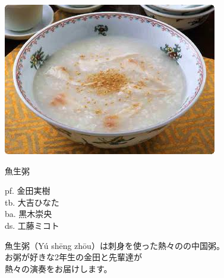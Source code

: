 \documentclass[a4paper]{article}
\begin{document}
\begin{minipage}{0.25\textheight}
    \flushleft
    \includegraphics[width=0.25\textheight]{./FULLHOUSE/resources/6.jpeg}
\end{minipage}
\begin{minipage}{\textwidth - 0.25\textheight}
    \flushleft
    \Huge \vspace{1em}魚生粥\vspace{1em}\normalsize \\
    \begin{minipage}{11em}
        \flushleft
        \Large
        pf. 金田実樹\\tb. 大吉ひなた\\ba. 黒木崇央\\ds. 工藤ミコト
    \end{minipage}
    \begin{minipage}{\textwidth - 18em}
        \flushleft
        \large
        魚生粥（Yú shēng zhōu）は刺身を使った熱々のの中国粥。\\お粥が好きな2年生の金田と先輩達が\\熱々の演奏をお届けします。
    \end{minipage}
\end{minipage}
\end{document}
